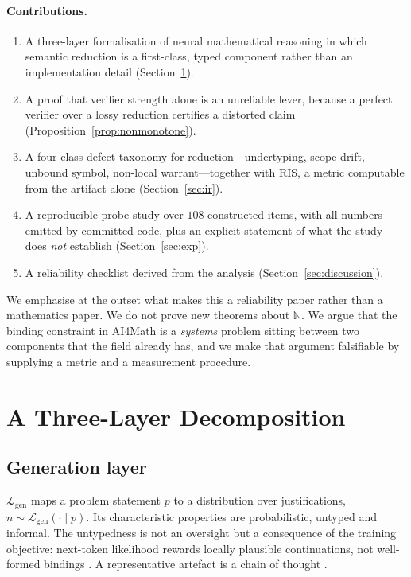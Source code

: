 \documentclass[11pt,a4paper]{article}
\theoremstyle{plain}
\theoremstyle{definition}
\newcommand{\RIS}{\textnormal{\textsc{RIS}}}
\newcommand{\LayerG}{\mathcal{L}_{\mathrm{gen}}}
\begin{document}
\paragraph{Contributions.}
\begin{enumerate}[label=(\roman*)]
\item A three-layer formalisation of neural mathematical reasoning in which
      semantic reduction is a first-class, typed component rather than an
      implementation detail (Section~\ref{sec:model}).
\item A proof that verifier strength alone is an unreliable lever, because
      a perfect verifier over a lossy reduction certifies a distorted claim
      (Proposition~\ref{prop:nonmonotone}).
\item A four-class defect taxonomy for reduction---undertyping, scope drift,
      unbound symbol, non-local warrant---together with \RIS{}, a metric
      computable from the artifact alone (Section~\ref{sec:ir}).
\item A reproducible probe study over $108$ constructed items, with all
      numbers emitted by committed code, plus an explicit statement of what
      the study does \emph{not} establish (Section~\ref{sec:exp}).
\item A reliability checklist derived from the analysis
      (Section~\ref{sec:discussion}).
\end{enumerate}

We emphasise at the outset what makes this a reliability paper rather than
a mathematics paper. We do not prove new theorems about $\mathbb{N}$. We
argue that the binding constraint in AI4Math is a \emph{systems} problem
sitting between two components that the field already has, and we make that
argument falsifiable by supplying a metric and a measurement procedure.

\section{A Three-Layer Decomposition}
\label{sec:model}

\subsection{Generation layer}

$\LayerG$ maps a problem statement $p$ to a distribution over
justifications, $n\sim\LayerG(\cdot\mid p)$. Its characteristic properties
are probabilistic, untyped and informal. The untypedness is not an oversight
but a consequence of the training objective: next-token likelihood rewards
locally plausible continuations, not well-formed bindings
\citep{bender2021parrots}. A representative artefact is a chain of
thought \citep{wei2022cot}.
\end{document}
